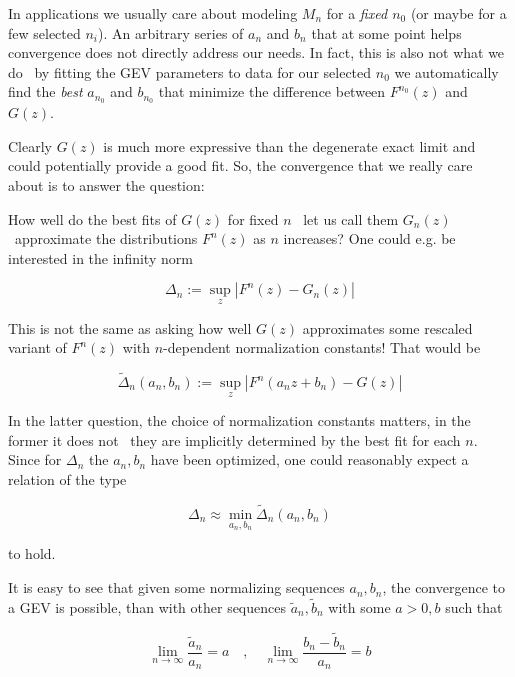 In applications we usually care about modeling $M_n$ for a \textit{fixed $n_0$} (or
maybe for a few selected $n_i$). An arbitrary series of $a_n$ and $b_n$ that at
some point helps convergence does not directly address our needs. In fact, this
is also not what we do \textemdash\ by fitting the GEV parameters to data for our selected
$n_0$ we automatically find the \textit{best} $a_{n_0}$ and $b_{n_0}$ that minimize the
difference between $F^{n_0}(z)$ and $G(z)$.

Clearly $G(z)$ is much more expressive than the degenerate exact limit and could
potentially provide a good fit. So, the convergence that we really care about is
to answer the question:

How well do the best fits of $G(z)$ for fixed $n$ \textemdash\ let us call them
$G_n(z)$ \textemdash\ approximate the distributions $F^n(z)$ as $n$ increases?
One could e.g. be interested in the infinity norm

\begin{equation}
  \Delta_n := \sup_z | F^n(z) - G_n(z) |
\end{equation}


This is not the same as asking how well $G(z)$ approximates some rescaled
variant of $F^n(z)$ with $n$-dependent normalization constants! That would be


\begin{equation}
  \tilde{\Delta}_n(a_n, b_n) := \sup_z |F^n(a_n z + b_n) - G(z) |
\end{equation}


In the latter question, the choice of normalization constants matters, in the
former it does not \textemdash\ they are implicitly determined by the best fit for each
$n$. Since for $\Delta_n$ the $a_n, b_n$ have been optimized, one could
reasonably expect a relation of the type


\begin{equation}
  \Delta_n \approx \min_{a_n, b_n} \tilde{\Delta}_n(a_n, b_n)
\end{equation}


to hold.

It is easy to see that given some normalizing sequences $a_n, b_n$, the
convergence to a GEV is possible, than with other sequences $\tilde{a}_n,
\tilde{b}_n$ with some $a>0, b$ such that


\begin{equation}
  \lim_{n\rightarrow \infty} \frac{\tilde{a}_n}{a_n} = a \quad,\quad \lim_{n \rightarrow \infty} \frac{b_n-\tilde{b}_n}{a_n} = b
\end{equation}


